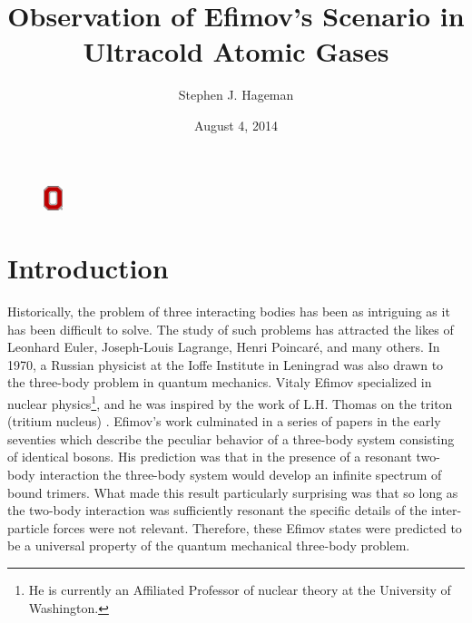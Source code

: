 \documentclass[prl,onecolumn,amsmath,amssymb,titlepage,nofootinbib,preprint]{revtex4-1}
\begin{document}
	\title{Observation of Efimov's Scenario in Ultracold Atomic Gases}
	\author{Stephen J. Hageman}
	\date{August 4, 2014}

	\begin{figure}[b]
		\includegraphics[width=0.05\textwidth]{Figures/BlockO}
	\end{figure}

	\maketitle
	\thispagestyle{empty}


\section{Introduction}
	\setcounter{page}{1}	%
	Historically, the problem of three interacting bodies has been as intriguing as it has been difficult to solve.  The  study of such problems has attracted the likes of Leonhard Euler, Joseph-Louis Lagrange, Henri Poincar\'{e}, and many others.  In 1970, a Russian physicist at the Ioffe Institute in Leningrad was also drawn to the three-body problem in quantum mechanics.  Vitaly Efimov specialized in nuclear physics\footnote{He is currently an Affiliated Professor of nuclear theory at the University of Washington.}, and he was inspired by the work of L.H. Thomas on the triton (tritium nucleus) \cite{Thomas1935}.  Efimov's work culminated in a series of papers in the early seventies \cite{Efimov1970}\cite{Efimov1971}\cite{Efimov1979} which describe the peculiar behavior of a three-body system consisting of identical bosons.  His prediction was that in the presence of a resonant two-body interaction the three-body system would develop an infinite spectrum of bound trimers.  What made this result particularly surprising was that so long as the two-body interaction was sufficiently resonant the specific details of the inter-particle forces were not relevant.  Therefore, these Efimov states were predicted to be a universal property of the quantum mechanical three-body problem.
	
\end{document}
